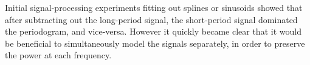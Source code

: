 \documentclass[12pt,twocolumn,tighten]{aastex62}
\begin{document}
Initial signal-processing experiments fitting out splines or sinusoids
showed that after subtracting out the long-period signal, the short-period
signal dominated the periodogram, and vice-versa.
However it quickly became clear that it would be beneficial to simultaneously
model the signals separately, in order to
preserve the power at each frequency.




% 
% 
% 
\end{document}
